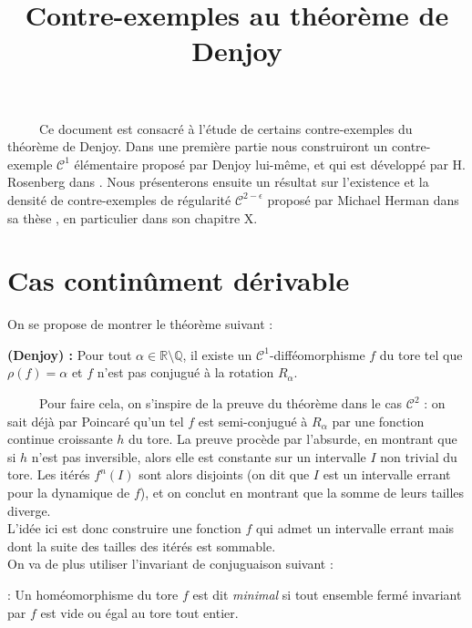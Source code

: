 \documentclass[11pt,a4paper]{article}
\title{\textbf{Contre-exemples au théorème de Denjoy }}
\date{}
\begin{document}
\maketitle

\ \ \ \ \ Ce document est consacré à l'étude de certains contre-exemples du théorème de Denjoy. Dans une première partie nous construiront un contre-exemple $\mathcal{C}^1$ élémentaire proposé par Denjoy lui-même, et qui est développé par H. Rosenberg dans \cite{rosenberg}. Nous présenterons ensuite un résultat sur l'existence et la densité de contre-exemples de régularité $\mathcal{C}^{2-\epsilon}$ proposé par Michael Herman dans sa thèse \cite{herman}, en particulier dans son chapitre X.

\section{Cas continûment dérivable}

On se propose de montrer le théorème suivant :

\begin{theorem}\textbf{(Denjoy) : }
Pour tout $\alpha \in \mathbb{R} \setminus \mathbb{Q}$, il existe un $\mathcal{C}^1$-difféomorphisme $f$ du tore tel que $\rho(f)=\alpha$ et $f$ n'est pas conjugué à la rotation $R_\alpha$.
\end{theorem}

\ \ \ \ \ Pour faire cela, on s'inspire de la preuve du théorème dans le cas $\mathcal{C}^2$ : on sait déjà par Poincaré qu'un tel $f$ est semi-conjugué à $R_\alpha$ par une fonction continue croissante $h$ du tore. La preuve procède par l'absurde, en montrant que si $h$ n'est pas inversible, alors elle est constante sur un intervalle $I$ non trivial du tore. Les itérés $f^n(I)$ sont alors disjoints (on dit que $I$ est un intervalle errant pour la dynamique de $f$), et on conclut en montrant que la somme de leurs tailles diverge. \\ 
L'idée ici est donc construire une fonction $f$ qui admet un intervalle errant mais dont la suite des tailles des itérés est sommable. \\

On va de plus utiliser l'invariant de conjuguaison suivant : 

\begin{defin} : Un homéomorphisme du tore $f$ est dit \textit{minimal} si tout ensemble fermé invariant par  $f$ est vide ou égal au tore tout entier. 
\end{defin}
\end{document}
